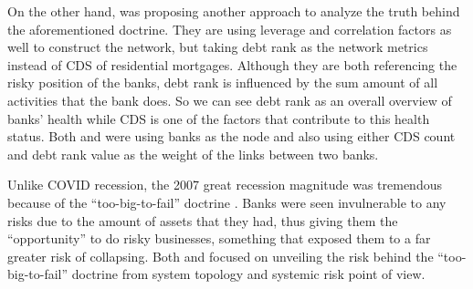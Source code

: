 \documentclass[a4paper,11pt]{article}
\begin{document}
On the other hand, \cite{Battiston_Puliga_Kaushik_Tasca_Caldarelli_2012} was proposing another approach to analyze the truth behind the aforementioned doctrine. They are using leverage and correlation factors as well to construct the network, but taking debt rank as the network metrics instead of CDS of residential mortgages. Although they are both referencing the risky position of the banks, debt rank is influenced by the sum amount of all activities that the bank does. So we can see debt rank as an overall overview of banks’ health while CDS is one of the factors that contribute to this health status. Both \cite{Markose_Giansante_Shaghaghi_2012} and \cite{Battiston_Puliga_Kaushik_Tasca_Caldarelli_2012} were using banks as the node and also using either CDS count and debt rank value as the weight of the links between two banks.

Unlike COVID recession, the 2007 great recession magnitude was tremendous because of the “too-big-to-fail” doctrine \citep{Zhou_2009}. Banks were seen invulnerable to any risks due to the amount of assets that they had, thus giving them the “opportunity” to do risky businesses, something that exposed them to a far greater risk of collapsing. Both \cite{Markose_Giansante_Shaghaghi_2012} and \cite{Battiston_Puliga_Kaushik_Tasca_Caldarelli_2012} focused on unveiling the risk behind the “too-big-to-fail” doctrine from system topology and systemic risk point of view.
\end{document}
